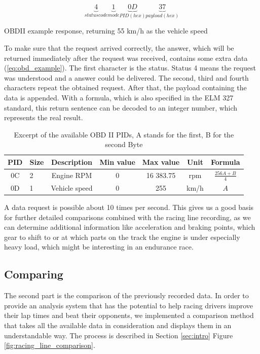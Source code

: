 \begin{equation}
	\label{eq:obd_example}
		\underbrace{4}_{status code}
		\underbrace{1}_{mode}
		\underbrace{0D}_{PID (hex)}
		\underbrace{37}_{payload (hex)}
\end{equation}
\begin{center}
	OBDII example response, returning 55 km/h as the vehicle speed
\end{center}

To make sure that the request arrived correctly, the answer, which will be returned immediately after the request was received, contains some extra data (\ref{eq:obd_example}). The first character is the status. Status 4 means the request was understood and a answer could be delivered. The second, third and fourth characters repeat the obtained request. After that, the payload containing the data is appended. With a formula, which is also specified in the ELM 327 standard, this return sentence can be decoded to an integer number, which represents the real result.

\begin{table}[!ht]
	\begin{center}
		\begin{tabularx}{\textwidth}{|c | X | c | c | c | c | c |}
			\hline
			PID & Size & Description & Min value & Max value & Unit & Formula\\ \hline
			0C & 2 & Engine RPM & 0 & 16 383.75 & rpm & $\frac{256A + B}{4}$\\ \hline
			0D & 1 & Vehicle speed & 0 & 255 & km/h & $A$\\ \hline
		\end{tabularx}
	\end{center}
	\caption{Excerpt of the available OBD II PIDs, A stands for the first, B for the second Byte}
\end{table}

A data request is possible about 10 times per second. This gives us a good basis for further detailed comparisons combined with the racing line recording, as we can determine additional information like acceleration and braking points, which gear to shift to or at which parts on the track the engine is under especially heavy load, which might be interesting in an endurance race.

\subsection{Comparing}
\label{sec:comparing}
The second part is the comparison of the previously recorded data. In order to provide an analysis system that has the potential to help racing drivers improve their lap times and beat their opponents, we implemented a comparison method that takes all the available data in consideration and displays them in an understandable way. The process is described in Section \ref{sec:intro} Figure \ref{fig:racing_line_comparison}.

